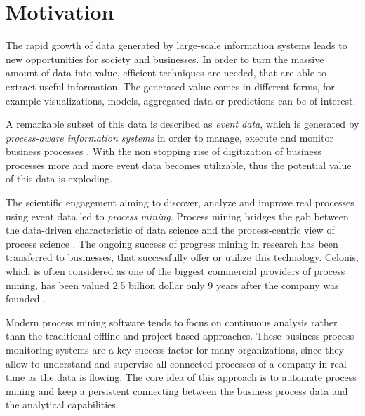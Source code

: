 
\section{Motivation}

The rapid growth of data generated by large-scale information systems leads to new opportunities for  society and businesses.
In order to turn the massive amount of data into value, efficient techniques are needed, that are able to extract useful information.
The generated value comes in different forms, for example visualizations, models, aggregated data or predictions can be of interest. 

A remarkable subset of this data is described as \textit{event data}, which is generated by \textit{process-aware information systems} in order to manage, execute and monitor business processes \cite{DBLP:journals/topnoc/Aalst09}.
With the non stopping rise of digitization of business processes more and more event data becomes utilizable, thus the potential value of this data is exploding.

The scientific engagement aiming to discover, analyze and improve real processes using event data led to \textit{process mining}. Process mining bridges the gab between the data-driven characteristic of data science and the process-centric view of process science \cite{DBLP:books/sp/Aalst16}.
The ongoing success of progress mining in research has been transferred to businesses, that successfully offer or utilize this technology.
Celonis, which is often considered as one of the biggest commercial providers of process mining, has been valued 2.5 billion dollar only 9 years after the company was founded \cite{celonis}.

Modern process mining software tends to focus on continuous analysis rather than the traditional offline and project-based approaches.
These business process monitoring systems are a key success factor for many organizations, since they allow to understand and supervise all connected processes of a company in real-time as the data is flowing.
The core idea of this approach is to automate process mining and keep a persistent connecting between the business process data and the analytical capabilities.

